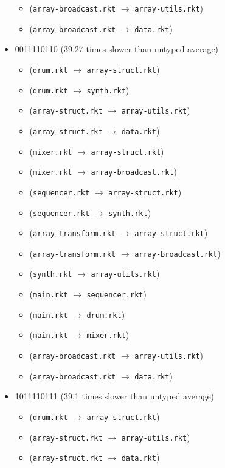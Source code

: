\documentclass{article}
\newcommand{\mono}[1]{\texttt{#1}}
\begin{document}
\begin{itemize}
\begin{itemize}
  \item (\mono{array-broadcast.rkt} $\rightarrow$ \mono{array-utils.rkt})
  \item (\mono{array-broadcast.rkt} $\rightarrow$ \mono{data.rkt})
  \end{itemize}
\item 0011110110 (39.27 times slower than untyped average)
  \begin{itemize}
  \item (\mono{drum.rkt} $\rightarrow$ \mono{array-struct.rkt})
  \item (\mono{drum.rkt} $\rightarrow$ \mono{synth.rkt})
  \item (\mono{array-struct.rkt} $\rightarrow$ \mono{array-utils.rkt})
  \item (\mono{array-struct.rkt} $\rightarrow$ \mono{data.rkt})
  \item (\mono{mixer.rkt} $\rightarrow$ \mono{array-struct.rkt})
  \item (\mono{mixer.rkt} $\rightarrow$ \mono{array-broadcast.rkt})
  \item (\mono{sequencer.rkt} $\rightarrow$ \mono{array-struct.rkt})
  \item (\mono{sequencer.rkt} $\rightarrow$ \mono{synth.rkt})
  \item (\mono{array-transform.rkt} $\rightarrow$ \mono{array-struct.rkt})
  \item (\mono{array-transform.rkt} $\rightarrow$ \mono{array-broadcast.rkt})
  \item (\mono{synth.rkt} $\rightarrow$ \mono{array-utils.rkt})
  \item (\mono{main.rkt} $\rightarrow$ \mono{sequencer.rkt})
  \item (\mono{main.rkt} $\rightarrow$ \mono{drum.rkt})
  \item (\mono{main.rkt} $\rightarrow$ \mono{mixer.rkt})
  \item (\mono{array-broadcast.rkt} $\rightarrow$ \mono{array-utils.rkt})
  \item (\mono{array-broadcast.rkt} $\rightarrow$ \mono{data.rkt})
  \end{itemize}
\item 1011110111 (39.1 times slower than untyped average)
  \begin{itemize}
  \item (\mono{drum.rkt} $\rightarrow$ \mono{array-struct.rkt})
  \item (\mono{array-struct.rkt} $\rightarrow$ \mono{array-utils.rkt})
  \item (\mono{array-struct.rkt} $\rightarrow$ \mono{data.rkt})

\end{itemize}
\end{itemize}
\end{document}
